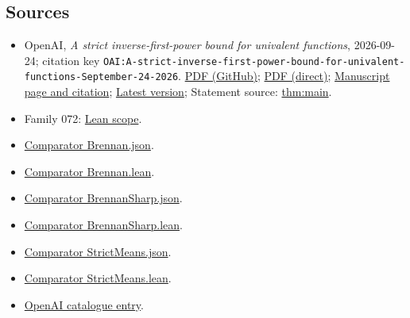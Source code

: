 \documentclass[11pt]{article}
\begin{document}
\subsection{Sources}
\begin{itemize}
\item OpenAI, \emph{A strict inverse-first-power bound for univalent functions}, 2026-09-24; citation key \texttt{OAI:A-strict-inverse-first-power-bound-for-univalent-functions-September-24-2026}. \href{https://github.com/openai/math/blob/adc7f1241b42e322a6451854ab7e4b4c146bf78a/preprints/A-strict-inverse-first-power-bound-for-univalent-functions-September-24-2026/paper.pdf}{PDF (GitHub)}; \href{https://github.com/openai/math/raw/adc7f1241b42e322a6451854ab7e4b4c146bf78a/preprints/A-strict-inverse-first-power-bound-for-univalent-functions-September-24-2026/paper.pdf}{PDF (direct)}; \href{https://github.com/openai/math/blob/adc7f1241b42e322a6451854ab7e4b4c146bf78a/preprints/A-strict-inverse-first-power-bound-for-univalent-functions-September-24-2026/README.md}{Manuscript page and citation}; \href{https://github.com/openai/math/blob/main/preprints/A-strict-inverse-first-power-bound-for-univalent-functions-September-24-2026/paper.pdf}{Latest version}; Statement source: \href{https://github.com/openai/math/blob/adc7f1241b42e322a6451854ab7e4b4c146bf78a/preprints/A-strict-inverse-first-power-bound-for-univalent-functions-September-24-2026/build/sections/00-introduction.tex\#L44}{thm:main}.
\item Family 072: \href{https://github.com/openai/math/blob/adc7f1241b42e322a6451854ab7e4b4c146bf78a/lean/docs/072.md}{Lean scope}.
\item \href{https://github.com/openai/math/blob/adc7f1241b42e322a6451854ab7e4b4c146bf78a/lean/ComparatorChallenges/Brennan.json}{Comparator Brennan.json}.
\item \href{https://github.com/openai/math/blob/adc7f1241b42e322a6451854ab7e4b4c146bf78a/lean/ComparatorChallenges/Brennan.lean}{Comparator Brennan.lean}.
\item \href{https://github.com/openai/math/blob/adc7f1241b42e322a6451854ab7e4b4c146bf78a/lean/ComparatorChallenges/BrennanSharp.json}{Comparator BrennanSharp.json}.
\item \href{https://github.com/openai/math/blob/adc7f1241b42e322a6451854ab7e4b4c146bf78a/lean/ComparatorChallenges/BrennanSharp.lean}{Comparator BrennanSharp.lean}.
\item \href{https://github.com/openai/math/blob/adc7f1241b42e322a6451854ab7e4b4c146bf78a/lean/ComparatorChallenges/StrictMeans.json}{Comparator StrictMeans.json}.
\item \href{https://github.com/openai/math/blob/adc7f1241b42e322a6451854ab7e4b4c146bf78a/lean/ComparatorChallenges/StrictMeans.lean}{Comparator StrictMeans.lean}.
\item \href{https://github.com/openai/math/blob/adc7f1241b42e322a6451854ab7e4b4c146bf78a/CONTENTS.md}{OpenAI catalogue entry}.
\end{itemize}
\end{document}
